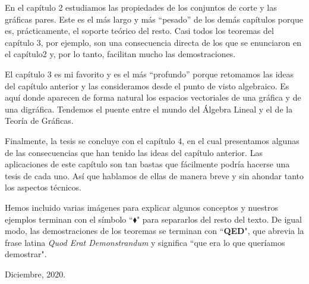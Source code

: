 En el capítulo 2 estudiamos las propiedades de los conjuntos de corte y las gráficas pares. Este es el más largo y más ``pesado” de los demás capítulos porque es, prácticamente, el soporte teórico del resto. Casi todos los teoremas del capítulo 3, por ejemplo, son una consecuencia directa de los que se enunciaron en el capítulo2 y, por lo tanto, facilitan mucho las demostraciones. 


El capítulo 3 es mi favorito y es el más ``profundo” porque retomamos las ideas del capítulo anterior y las consideramos desde el punto de visto algebraico. Es aquí donde aparecen de forma natural los espacios vectoriales de una gráfica y de una digráfica. Tendemos el puente entre el mundo del Álgebra Lineal y el de la Teoría de Gráficas.  


Finalmente, la tesis se concluye con el capítulo 4, en el cual presentamos algunas de las consecuencias que han tenido las ideas del capítulo anterior. Las aplicaciones de este capítulo son tan bastas que fácilmente podría hacerse una tesis de cada uno. Así que hablamos de ellas de manera breve y sin ahondar tanto los aspectos técnicos.


Hemos incluido varias imágenes para explicar algunos conceptos y nuestros ejemplos terminan con el símbolo ``$\blacklozenge$" \hspace{1 mm} para separarlos del resto del texto. De igual modo, las demostraciones de los teoremas se terminan con ``\textbf{QED}", que abrevia la frase latina \textit{Quod Erat Demonstrandum} y significa ``que era lo que queríamos demostrar".

\begin{flushright}

Diciembre, 2020.

\end{flushright}